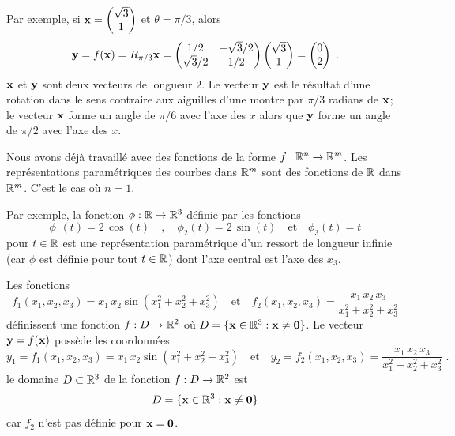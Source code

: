 {\begin{egg}
Par exemple, si
$\displaystyle \mathbf{x} = \begin{pmatrix} \sqrt{3} \\ 1 \end{pmatrix}$
et $\theta=\pi/3$, alors
\[
\mathbf{y}= f(\mathbf{x}) = R_{\pi/3}\mathbf{x}
= \begin{pmatrix} 1/2 & -\sqrt{3}/2 \\ \sqrt{3}/2 & 1/2 \end{pmatrix}
\begin{pmatrix} \sqrt{3} \\ 1 \end{pmatrix}
= \begin{pmatrix} 0 \\ 2 \end{pmatrix} \; .
\]
$\mathbf{x}$ et $\mathbf{y}$ sont deux vecteurs de longueur $2$.  Le vecteur
$\mathbf{y}$ est le résultat d'une rotation dans le sens contraire aux
aiguilles d'une montre par $\pi/3$ radians de $\mathbf{x}$; le vecteur
$\mathbf{x}$ forme un angle de $\pi/6$ avec l'axe des $x$ alors que
$\mathbf{y}$ forme un angle de $\pi/2$ avec l'axe des $x$.
\end{egg}


\begin{egg}
Nous avons déjà travaillé avec des fonctions de la forme
$f:\mathbb{R}^n\rightarrow \mathbb{R}^m$.  Les représentations paramétriques des
courbes dans $\mathbb{R}^m$ sont des fonctions de $\mathbb{R}$ dans $\mathbb{R}^m$.  C'est
le cas où $n=1$.

Par exemple, la fonction $\phi:\mathbb{R}\rightarrow \mathbb{R}^3$ définie par les
fonctions
\[
\phi_1(t) = 2\,\cos(t) \quad , \quad
\phi_2(t) = 2\,\sin(t) \quad \text{et} \quad
\phi_3(t) = t
\]
pour $t \in \mathbb{R}$ est une représentation paramétrique d'un ressort
de longueur infinie (car $\phi$ est définie pour tout $t\in \mathbb{R}$) dont
l'axe central est l'axe des $x_3$.
\end{egg}

\begin{egg}
Les fonctions
\[
f_1(x_1,x_2,x_3) = x_1\,x_2 \sin(x_1^2+x_2^2+x_3^2)
\quad \text{et} \quad
f_2(x_1,x_2,x_3) = \frac{x_1\,x_2\,x_3}{x_1^2+x_2^2+x_3^2}
\]
définissent une fonction $f:D\rightarrow \mathbb{R}^2$ où
$D = \{\mathbf{x} \in \mathbb{R}^3 : \mathbf{x} \neq \mathbf{0}\}$.  Le vecteur
$\mathbf{y} = f(\mathbf{x})$ possède les coordonnées
\[
y_1 = f_1(x_1,x_2,x_3)= x_1\,x_2 \sin(x_1^2+x_2^2+x_3^2)
\quad \text{et} \quad
y_2 = f_2(x_1,x_2,x_3)= \frac{x_1\,x_2\,x_3}{x_1^2+x_2^2+x_3^2} \; .
\]
le domaine $D \subset \mathbb{R}^3$ de la fonction $f:D\rightarrow \mathbb{R}^2$ est
\[
D = \{ \mathbf{x} \in \mathbb{R}^3 : \mathbf{x} \neq \mathbf{0} \}
\]
car $f_2$ n'est pas définie pour $\mathbf{x} = \mathbf{0}$.
\end{egg}

}

